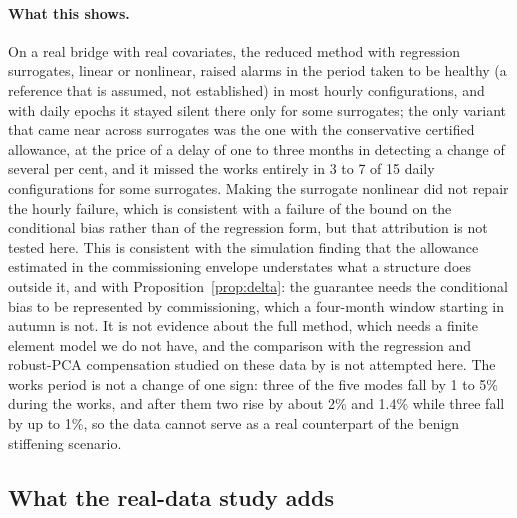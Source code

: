 \documentclass[12pt,a4paper]{article}
\newenvironment{revblock}{}{}
\newenvironment{revblock}{\begingroup\color{revcol}}{\endgroup}
\newcommand{\rtwo}[1]{#1}
\newcommand{\rtwo}[1]{{\color{revcolb}#1}}
\begin{document}
\begin{revblock}
\paragraph{What this shows.} \rtwo{On a real bridge with real covariates, the reduced method with regression surrogates, linear or nonlinear, raised alarms in the period taken to be healthy (a reference that is assumed, not established) in most hourly configurations, and with daily epochs it stayed silent there only for some surrogates; the only variant that came near across surrogates was the one with the conservative certified allowance, at the price of a delay of one to three months in detecting a change of several per cent, and it missed the works entirely in 3 to 7 of 15 daily configurations for some surrogates.} Making the surrogate nonlinear did not repair the hourly failure, which is consistent with a failure of the bound on the conditional bias rather than of the regression form, but that attribution is not tested here. This is consistent with the simulation finding that the allowance estimated in the commissioning envelope understates what a structure does outside it, and with Proposition~\ref{prop:delta}: the guarantee needs the conditional bias to be represented by commissioning, which a four-month window starting in autumn is not. It is not evidence about the full method, which needs a finite element model we do not have, and the comparison with the regression and robust-PCA compensation studied on these data by \citet{maes2022kw51} is not attempted here. The works period is not a change of one sign: three of the five modes fall by 1 to 5\% during the works, and after them two rise by about 2\% and 1.4\% while three fall by up to 1\%, so the data cannot serve as a real counterpart of the benign stiffening scenario.
\end{revblock}


\subsection{What the real-data study adds}\label{sec:z24-adds}
\end{document}

